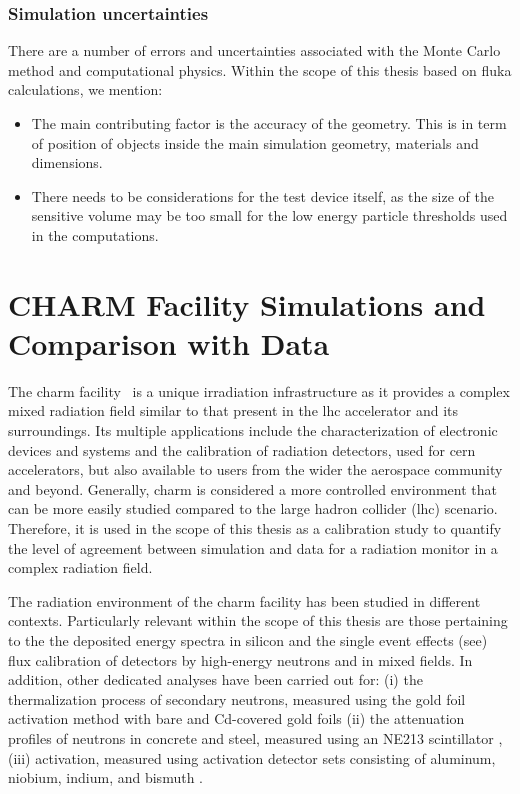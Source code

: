 \documentclass[encoding=utf8,british]{tumphthesis}
\begin{document}
\subsection{Simulation uncertainties}
There are a number of errors and uncertainties associated with the Monte Carlo method and computational physics. Within the scope of this thesis based on \acrshort{fluka} calculations, we mention:
\begin{itemize}
    \item The main contributing factor is the accuracy of the geometry. This is in term of position of objects inside the main simulation geometry, materials and dimensions.
    \item There needs to be considerations for the test device itself, as the size of the sensitive volume may be too small for the low energy particle thresholds used in the computations.
\end{itemize}



\chapter{CHARM Facility Simulations and Comparison with Data}
\label{chapter:CHARM}

The \acrfull{charm} facility~\cite{Mekki:2016tbj} is a unique irradiation infrastructure as it provides a complex mixed radiation field similar to that present in the \acrshort{lhc} accelerator and its surroundings. Its multiple applications include the characterization of electronic devices and systems and the calibration of radiation detectors, used for \acrshort{cern} accelerators, but also available to users from the wider the aerospace community and beyond. Generally, \acrshort{charm} is considered a more controlled environment that can be more easily studied compared to the large hadron collider (\acrshort{lhc}) scenario. Therefore, it is used in the scope of this thesis as a calibration study to quantify the level of agreement between simulation and data for a radiation monitor in a complex radiation field.

The radiation environment of the \acrshort{charm} facility has been studied in different contexts. Particularly relevant within the scope of this thesis are those pertaining to the the deposited energy spectra in silicon  \cite{Cazzaniga:2020rok} and the single event effects (\acrshort{see}) flux calibration of detectors \cite{Cecchetto:2757331} by high-energy neutrons and in mixed fields. In addition, other dedicated analyses have been carried out for: (i) the thermalization process of secondary neutrons, measured using the gold foil activation method with bare and Cd-covered gold foils \cite{CHARM:Japan-thermal-neutrons}
(ii) the attenuation profiles of neutrons in concrete and steel, measured using an NE213 scintillator \cite{CHARM:Japan-concrete}, (iii) activation, measured using activation detector sets consisting of aluminum, niobium, indium, and bismuth \cite{CHARM:Japan-activation}.
\end{document}
